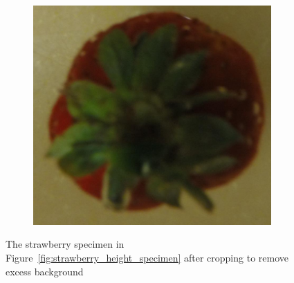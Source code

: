 \documentclass {udthesis}
\begin{document}
\begin{figure}
\begin{subfigure}[]{0.12\textwidth}
      \caption{}
  \end{subfigure}
  \begin{subfigure}[]{0.12\textwidth}
      \includegraphics[width=\textwidth]{strawberry4_obj_01/strawberry4_001_08}
      \caption{}
  \end{subfigure}
\caption[Images of a strawberry specimen after cropping excess background]{The strawberry specimen in Figure~\ref{fig:strawberry_height_specimen} after cropping to remove excess background}
\label{fig:strawberry_height_specimen_cropped}
\end{figure}	
\end{document}
